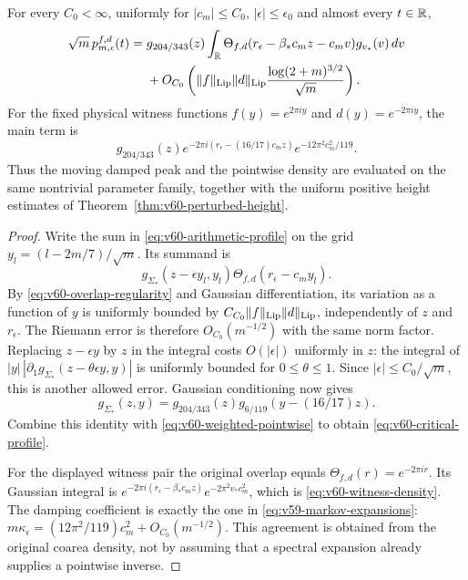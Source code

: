 \begin{theorem}
\label{thm:v60-critical-profile}
For every $C_0<\infty$, uniformly for $|c_m|\le C_0$,
$|\epsilon|\le\epsilon_0$ and almost every $t\in\mathbb R$,
\begin{align}
 \sqrt m\,p_{m,\epsilon}^{f,d}(t)
 ={}&g_{204/343}(z)
       \int_\R\Theta_{f,d}(r_\epsilon-\beta_*c_m z-c_m v)
                                g_{v_*}(v)\,dv\notag\\
 &+O_{C_0}\left(\|f\|_{\rm Lip}\|d\|_{\rm Lip}
                      \frac{\log(2+m)^{3/2}}{\sqrt m}\right).
                                                  \label{eq:v60-critical-profile}
\end{align}
For the fixed physical witness functions
$f(y)=e^{2\pi iy}$ and $d(y)=e^{-2\pi iy}$, the main term is
\begin{equation}\label{eq:v60-witness-density}
 g_{204/343}(z)
 e^{-2\pi i(r_\epsilon-(16/17)c_m z)}
                      e^{-12\pi^2c_m^2/119}.
\end{equation}
Thus the moving damped peak and the pointwise density are evaluated on
the same nontrivial parameter family, together with the uniform positive
height estimates of Theorem~\ref{thm:v60-perturbed-height}.
\end{theorem}
\begin{proof}
Write the sum in \eqref{eq:v60-arithmetic-profile} on the grid
$y_l=(l-2m/7)/\sqrt m$. Its summand is
\[
 g_{\Sigma_*}(z-\epsilon y_l,y_l)
                           \Theta_{f,d}(r_\epsilon-c_m y_l).
\]
By \eqref{eq:v60-overlap-regularity} and Gaussian differentiation, its
variation as a function of $y$ is uniformly bounded by
$C_{C_0}\|f\|_{\rm Lip}\|d\|_{\rm Lip}$, independently of $z$ and
$r_\epsilon$. The Riemann error is therefore $O_{C_0}(m^{-1/2})$
with the same norm factor. Replacing $z-\epsilon y$ by $z$ in the
integral costs $O(|\epsilon|)$ uniformly in $z$: the integral of
$|y|\,|\partial_1g_{\Sigma_*}(z-\theta\epsilon y,y)|$ is uniformly
bounded for $0\le\theta\le1$. Since $|\epsilon|\le C_0/\sqrt m$,
this is another allowed error. Gaussian conditioning now gives
\[
 g_{\Sigma_*}(z,y)=g_{204/343}(z)
                                  g_{6/119}(y-(16/17)z).
\]
Combine this identity with \eqref{eq:v60-weighted-pointwise} to obtain
\eqref{eq:v60-critical-profile}.

For the displayed witness pair the original overlap equals
$\Theta_{f,d}(r)=e^{-2\pi ir}$. Its Gaussian integral is
$e^{-2\pi i(r_\epsilon-\beta_*c_mz)}e^{-2\pi^2v_*c_m^2}$,
which is \eqref{eq:v60-witness-density}. The damping coefficient is
exactly the one in \eqref{eq:v59-markov-expansions}:
$m\kappa_\epsilon=(12\pi^2/119)c_m^2+O_{C_0}(m^{-1/2})$.
This agreement is obtained from the original coarea density, not by
assuming that a spectral expansion already supplies a pointwise inverse.
\end{proof}

